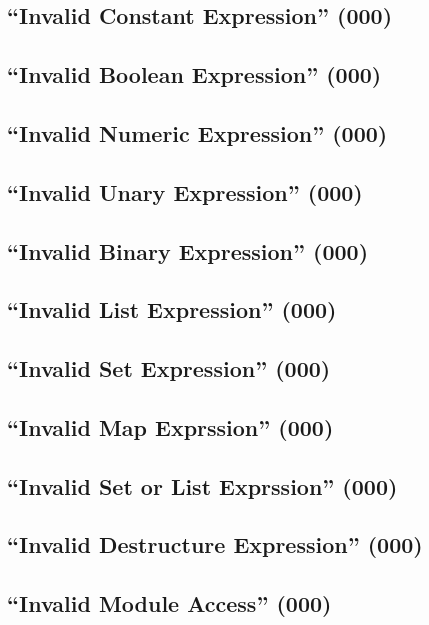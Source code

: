 \subsection{``Invalid Constant Expression'' (000)}

\subsection{``Invalid Boolean Expression'' (000)}

\subsection{``Invalid Numeric Expression'' (000)}

\subsection{``Invalid Unary Expression'' (000)}

\subsection{``Invalid Binary Expression'' (000)}

\subsection{``Invalid List Expression'' (000)}

\subsection{``Invalid Set Expression'' (000)}

\subsection{``Invalid Map Exprssion'' (000)}

\subsection{``Invalid Set or List Exprssion'' (000)}

\subsection{``Invalid Destructure Expression'' (000)}

\subsection{``Invalid Module Access'' (000)}

